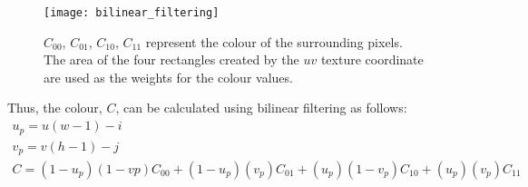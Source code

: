 \begin{figure}[ht]
  \texttt{[image: bilinear\_filtering]}
  \caption{$C_{00}$, $C_{01}$, $C_{10}$, $C_{11}$ represent the colour of the
  surrounding pixels. The area of the four rectangles created by the $uv$ 
  texture coordinate are used as the weights for the colour values.}
  \label{fig:image4}
\end{figure}

Thus, the colour, $C$, can be calculated using bilinear filtering as follows:
\begin{equation}
\begin{split}
  u_{p} = u(w - 1) - i \\
  v_{p} = v(h - 1) - j \\
  C = (1 - u_{p})(1 - v{p})C_{00} + (1 - u_{p})(v_{p})C_{01} + (u_{p})(1 -
  v_{p})C_{10} + (u_{p})(v_{p})C_{11}
\end{split}
\end{equation}


